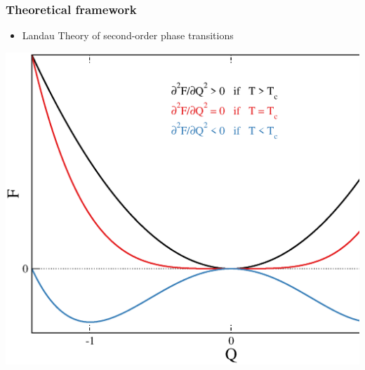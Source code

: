 \documentclass{beamer}
\begin{document}

\begin{frame}

\frametitle{Theoretical framework}
\begin{itemize}
\item Landau Theory of second-order phase transitions
\end{itemize}
\begin{center}
\includegraphics[width=0.8\linewidth]{Pictures/THEORY/transition.eps}
\end{center}

\end{frame}

\end{document}
